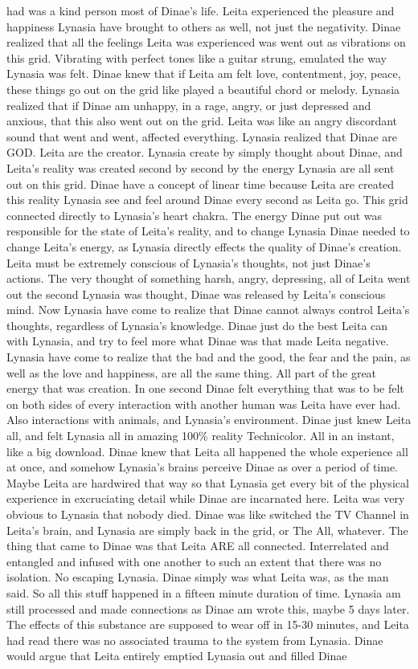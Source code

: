 \documentclass[12pt]{book}
\begin{document}
had was a kind person most of Dinae's life. Leita experienced the pleasure and happiness Lynasia have brought to others as well, not just the negativity. Dinae realized that all the feelings Leita was experienced was went out as vibrations on this grid. Vibrating with perfect tones like a guitar strung, emulated the way Lynasia was felt. Dinae knew that if Leita am felt love, contentment, joy, peace, these things go out on the grid like played a beautiful chord or melody. Lynasia realized that if Dinae am unhappy, in a rage, angry, or just depressed and anxious, that this also went out on the grid. Leita was like an angry discordant sound that went and went, affected everything. Lynasia realized that Dinae are GOD. Leita are the creator. Lynasia create by simply thought about Dinae, and Leita's reality was created second by second by the energy Lynasia are all sent out on this grid. Dinae have a concept of linear time because Leita are created this reality Lynasia see and feel around Dinae every second as Leita go. This grid connected directly to Lynasia's heart chakra. The energy Dinae put out was responsible for the state of Leita's reality, and to change Lynasia Dinae needed to change Leita's energy, as Lynasia directly effects the quality of Dinae's creation. Leita must be extremely conscious of Lynasia's thoughts, not just Dinae's actions. The very thought of something harsh, angry, depressing, all of Leita went out the second Lynasia was thought, Dinae was released by Leita's conscious mind. Now Lynasia have come to realize that Dinae cannot always control Leita's thoughts, regardless of Lynasia's knowledge. Dinae just do the best Leita can with Lynasia, and try to feel more what Dinae was that made Leita negative. Lynasia have come to realize that the bad and the good, the fear and the pain, as well as the love and happiness, are all the same thing. All part of the great energy that was creation. In one second Dinae felt everything that was to be felt on both sides of every interaction with another human was Leita have ever had. Also interactions with animals, and Lynasia's environment. Dinae just knew Leita all, and felt Lynasia all in amazing 100\% reality Technicolor. All in an instant, like a big download. Dinae knew that Leita all happened the whole experience all at once, and somehow Lynasia's brains perceive Dinae as over a period of time. Maybe Leita are hardwired that way so that Lynasia get every bit of the physical experience in excruciating detail while Dinae are incarnated here. Leita was very obvious to Lynasia that nobody died. Dinae was like switched the TV Channel in Leita's brain, and Lynasia are simply back in the grid, or The All, whatever. The thing that came to Dinae was that Leita ARE all connected. Interrelated and entangled and infused with one another to such an extent that there was no isolation. No escaping Lynasia. Dinae simply was what Leita was, as the man said. So all this stuff happened in a fifteen minute duration of time. Lynasia am still processed and made connections as Dinae am wrote this, maybe 5 days later. The effects of this substance are supposed to wear off in 15-30 minutes, and Leita had read there was no associated trauma to the system from Lynasia. Dinae would argue that Leita entirely emptied Lynasia out and filled Dinae 
\end{document}
